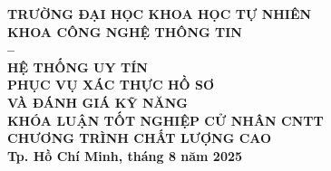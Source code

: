 
\begin{titlepage}
  
  \begin{center}

    {\large \textbf{TRƯỜNG ĐẠI HỌC KHOA HỌC TỰ NHIÊN}} \\
    \medskip
    {\large \bfseries KHOA CÔNG NGHỆ THÔNG TIN} \\[2.7cm]

    {\Large \bfseries \studentonename{} -- \studenttwoname} \\[3.7cm]

    {\LARGE \bfseries HỆ THỐNG UY TÍN \\ PHỤC VỤ XÁC THỰC HỒ SƠ \\[3mm] VÀ ĐÁNH GIÁ KỸ NĂNG} \\[3.7cm]

    {\large \bfseries KHÓA LUẬN TỐT NGHIỆP CỬ NHÂN CNTT} \\
    {\large \bfseries CHƯƠNG TRÌNH CHẤT LƯỢNG CAO} \\[2cm]

    \vfill
    {\large \bfseries Tp. Hồ Chí Minh, tháng 8 năm 2025}
  \end{center}
\end{titlepage}

\restoregeometry